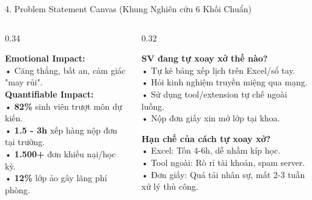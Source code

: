 \documentclass[aspectratio=169, 10pt]{beamer}
\begin{document}
\begin{frame}{4. Problem Statement Canvas (Khung Nghiên cứu 6 Khối Chuẩn)}
\begin{columns}[T]
\begin{column}{0.34\textwidth}
            \vspace{0.08cm}
            \begin{tcolorbox}[colback=CardBg, colframe=WarmAmber, title=5. IMPACT (Tác động)]
                \scriptsize
                \textbf{Emotional Impact:}\\
                • Căng thẳng, bất an, cảm giác "may rủi".\\
                \textbf{Quantifiable Impact:}\\
                • \textbf{82\%} sinh viên trượt môn dự kiến.\\
                • \textbf{1.5 - 3h} xếp hàng nộp đơn tại trường.\\
                • \textbf{1.500+} đơn khiếu nại/học kỳ.\\
                • \textbf{12\%} lớp ảo gây lãng phí phòng.
            \end{tcolorbox}
        \end{column}

        \begin{column}{0.32\textwidth}
            \begin{tcolorbox}[colback=CardBg, colframe=SoftTeal, title=3. ALTERNATIVES (Hiện tại)]
                \scriptsize
                \textbf{SV đang tự xoay xở thế nào?}\\
                • Tự kẻ bảng xếp lịch trên Excel/sổ tay.\\
                • Hỏi kinh nghiệm truyền miệng qua mạng.\\
                • Sử dụng tool/extension tự chế ngoài luồng.\\
                • Nộp đơn giấy xin mở lớp tại khoa.
            \end{tcolorbox}
            
            \vspace{0.08cm}
            \begin{tcolorbox}[colback=CardBg, colframe=SoftTeal, title=6. SHORTCOMINGS (Điểm yếu)]
                \scriptsize
                \textbf{Hạn chế của cách tự xoay xở?}\\
                • Excel: Tốn 4-6h, dễ nhầm kíp học.\\
                • Tool ngoài: Rò rỉ tài khoản, spam server.\\
                • Đơn giấy: Quá tải nhân sự, mất 2-3 tuần xử lý thủ công.
            \end{tcolorbox}
        \end{column}
    \end{columns}
\end{frame}
\end{document}
